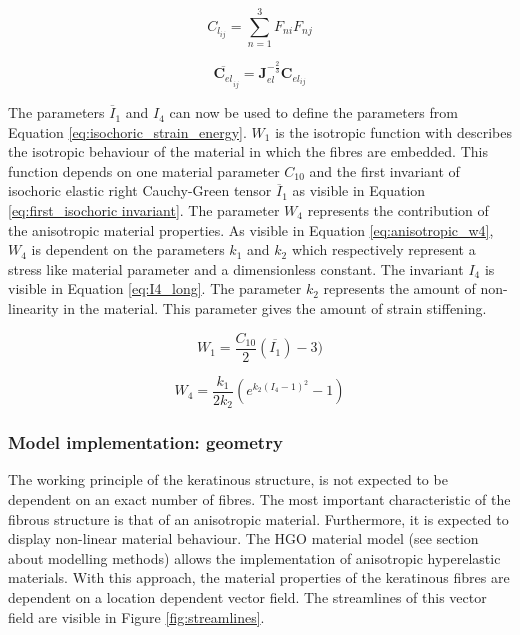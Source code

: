\begin{equation}
    C_{l_{ij}} = \sum_{n=1}^{3} F_{ni} F_{nj}
    \label{eq:local_cauchy-green_tensor}
\end{equation}

\begin{equation}
    \overline{\textbf{C}_{el}}_{_{ij}} = \textbf{J}^{-\frac{2}{3}}_{el} \textbf{C}_{el_{ij}}
    \label{eq:elastic_cauchy_green_tensor}
\end{equation}
  
 \qquad The parameters $\overline{I}_{1}$ and $I_{4}$ can now be used to define the parameters from Equation \ref{eq:isochoric_strain_energy}. $W_1$ is the isotropic function with describes the isotropic behaviour of the material in which the fibres are embedded. This function depends on one material parameter $C_{10}$ and the first invariant of isochoric elastic right Cauchy-Green tensor $\overline{I}_{1}$ as visible in Equation \ref{eq:first_isochoric invariant}. The parameter $W_4$ represents the contribution of the anisotropic material properties. As visible in Equation \ref{eq:anisotropic_w4}, $W_4$ is dependent on the parameters $k_1$ and $k_2$ which respectively represent a stress like material parameter and a dimensionless constant. The invariant $I_4$ is  visible in Equation \ref{eq:I4_long}. The parameter $k_{2}$ represents the amount of non-linearity in the material. This parameter gives the amount of strain stiffening.
  
 \begin{equation}
      W_1 = \frac{C_{10}}{2}(\overline{I_{1}}) - 3)
      \label{eq:first_isochoric invariant}
 \end{equation}
  
\begin{equation}
    W_4 = \frac{k_1}{2k_2}(e^{k_2(I_4 - 1)^2} - 1)
    \label{eq:anisotropic_w4}
\end{equation}

\subsubsection{Model implementation: geometry}\label{sec:HGO_model_geometry}
The working principle of the keratinous structure, is not expected to be dependent on an exact number of fibres. The most important characteristic of the fibrous structure is that of an anisotropic material. Furthermore, it is expected to display non-linear material behaviour. The HGO material model (see section about modelling methods) allows the implementation of anisotropic hyperelastic materials. With this approach, the material properties of the keratinous fibres are dependent on a location dependent vector field. The streamlines of this vector field are visible in Figure \ref{fig:streamlines}.\\ 

